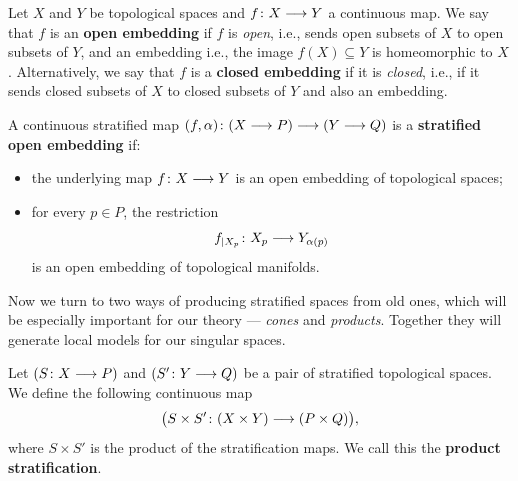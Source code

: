 \begin{definition}
    Let $X$ and $Y$ be topological spaces and $f\colon X \longrightarrow Y$ a continuous map. We say that $f$ is an \textbf{open embedding} if $f$ is \emph{open}, i.e., sends open subsets of $X$ to open subsets of $Y$, and an embedding i.e., the image $f(X) \subseteq Y$ is homeomorphic to $X$. Alternatively, we say that $f$ is a \textbf{closed embedding} if it is \emph{closed}, i.e., if it sends closed subsets of $X$ to closed subsets of $Y$ and also an embedding.
\end{definition}

\begin{definition}\label{ch4:: def: strat open emb}
    A continuous stratified map $(f,\alpha)\colon (X\longrightarrow P) \longrightarrow (Y \longrightarrow Q)$ is a \textbf{stratified open embedding} if:
    \begin{itemize}
        \item the underlying map $f\colon X \longrightarrow Y$ is an open embedding of topological spaces;
        \item for every $p \in P$, the restriction
        \begin{equation}
            f_{|X_{p}} \colon X_{p} \longrightarrow Y_{\alpha(p)}
        \end{equation}
        is an open embedding of topological manifolds.
    \end{itemize}
\end{definition}

Now we turn to two ways of producing stratified spaces from old ones, which will be especially important for our theory — \emph{cones} and \emph{products}. Together they will generate local models for our singular spaces.

\begin{definition}
    Let $(S \colon X \longrightarrow P)$ and $(S' \colon Y \longrightarrow Q)$ be a pair of stratified topological spaces. We define the following continuous map
    \begin{equation}
    \big(S\times S' \colon (X \times Y) \longrightarrow (P \times Q) \big),
    \end{equation}
    where $S\times S'$ is the product of the stratification maps. We call this the \textbf{product stratification}.
\end{definition}


